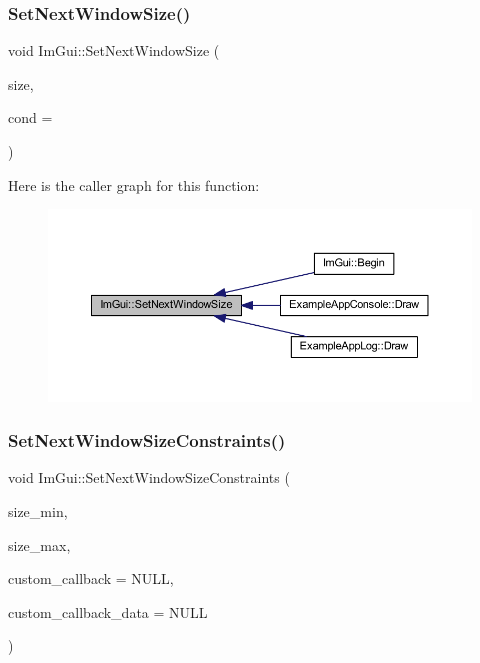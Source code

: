 \subsubsection{\texorpdfstring{Set\+Next\+Window\+Size()}{SetNextWindowSize()}}
{\footnotesize\ttfamily void Im\+Gui\+::\+Set\+Next\+Window\+Size (\begin{DoxyParamCaption}\item[{const \mbox{\hyperlink{struct_im_vec2}{Im\+Vec2}} \&}]{size,  }\item[{\mbox{\hyperlink{imgui_8h_aef890d6ac872e12c5804d0b3e4f7f103}{Im\+Gui\+Cond}}}]{cond = {} }\end{DoxyParamCaption})}

Here is the caller graph for this function\+:
\nopagebreak
\begin{figure}[H]
\begin{center}
\leavevmode
\includegraphics[width=350pt]{namespace_im_gui_ab33717bb71ef5e393ae18656fc6b229d_icgraph}
\end{center}
\end{figure}
\mbox{\label{namespace_im_gui_a157d5bcc362951e77eb3236864e879ce}} 
\subsubsection{\texorpdfstring{Set\+Next\+Window\+Size\+Constraints()}{SetNextWindowSizeConstraints()}}
{\footnotesize\ttfamily void Im\+Gui\+::\+Set\+Next\+Window\+Size\+Constraints (\begin{DoxyParamCaption}\item[{const \mbox{\hyperlink{struct_im_vec2}{Im\+Vec2}} \&}]{size\+\_\+min,  }\item[{const \mbox{\hyperlink{struct_im_vec2}{Im\+Vec2}} \&}]{size\+\_\+max,  }\item[{\mbox{\hyperlink{imgui_8h_a1cccf55557c2153a9d4af6db73dc3a91}{Im\+Gui\+Size\+Callback}}}]{custom\+\_\+callback = {\ttfamily NULL},  }\item[{void $\ast$}]{custom\+\_\+callback\+\_\+data = {\ttfamily NULL} }\end{DoxyParamCaption})}

